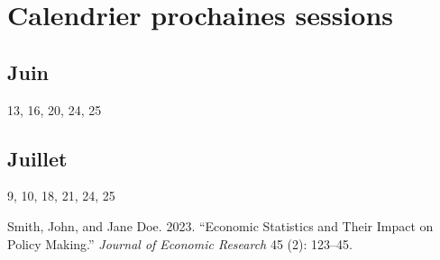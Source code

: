 \documentclass[
]{article}
\newlength{\cslhangindent}
\newlength{\cslentryspacingunit} %
\newenvironment{CSLReferences}[2] %
 {%
  \setlength{\parindent}{0pt}
  \ifodd #1
  \let\oldpar\par
  \def\par{\hangindent=\cslhangindent\oldpar}
  \fi
  \setlength{\parskip}{#2\cslentryspacingunit}
 }%
 {}
\begin{document}
\hypertarget{calendrier-prochaines-sessions}{%
\section{Calendrier prochaines
sessions}\label{calendrier-prochaines-sessions}}

\hypertarget{juin}{%
\subsection{Juin}\label{juin}}

13, 16, 20, 24, 25

\hypertarget{juillet}{%
\subsection{Juillet}\label{juillet}}

9, 10, 18, 21, 24, 25

\hypertarget{refs}{}
\begin{CSLReferences}{1}{0}
\leavevmode{}%
Smith, John, and Jane Doe. 2023. {``Economic Statistics and Their Impact
on Policy Making.''} \emph{Journal of Economic Research} 45 (2):
123--45.

\end{CSLReferences}
\end{document}

